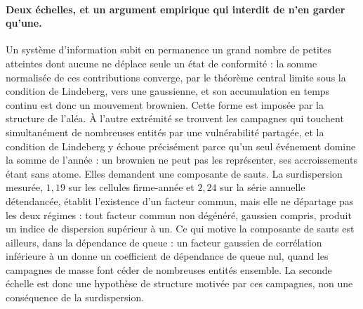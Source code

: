 \paragraph{Deux échelles, et un argument empirique qui interdit de n'en garder qu'une.}
Un système d'information subit en permanence un grand nombre de petites atteintes dont aucune
ne déplace seule un état de conformité : la somme normalisée de ces contributions converge, par
le théorème central limite sous la condition de Lindeberg, vers une gaussienne, et son
accumulation en temps continu est donc un mouvement brownien. Cette forme est imposée par la
structure de l'aléa. À l'autre extrémité se trouvent
les campagnes qui touchent simultanément de nombreuses entités par une vulnérabilité partagée,
et la condition de Lindeberg y échoue précisément parce qu'un seul événement domine la
somme de l'année : un brownien ne peut pas les représenter, ses accroissements étant sans
atome. Elles demandent une composante de sauts. La surdispersion mesurée, $1{,}19$ sur les
cellules firme-année et $2{,}24$ sur la série annuelle
détendancée, établit l'existence d'un facteur commun, mais elle ne départage pas les deux
régimes : tout facteur commun non dégénéré, gaussien compris, produit un indice de dispersion
supérieur à un. Ce qui motive la composante de sauts est ailleurs, dans la dépendance de queue :
un facteur gaussien de corrélation inférieure à un donne un coefficient de dépendance de queue
nul, quand les campagnes de masse font céder de nombreuses entités ensemble. La seconde échelle
est donc une hypothèse de structure motivée par ces campagnes, non une conséquence de la
surdispersion.

